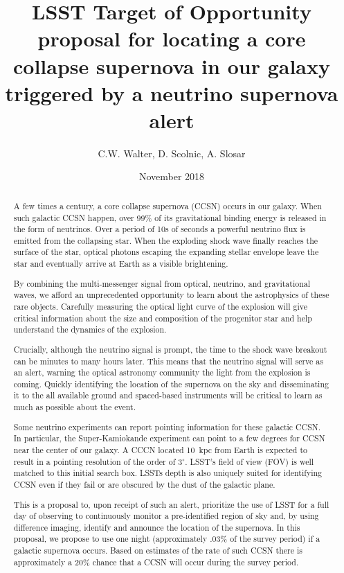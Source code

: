 \documentclass[12pt, letterpaper]{article}
\title{LSST Target of Opportunity proposal for locating a core collapse
  supernova in our galaxy triggered by a neutrino supernova alert}
\author{ C.W. Walter, D. Scolnic, A. Slosar}
\date{ November 2018}
\begin{document}
\maketitle

\begin{abstract}

  A few times a century, a core collapse supernova (CCSN) occurs in
  our galaxy. When such galactic CCSN happen, over 99\% of its
  gravitational binding energy is released in the form of neutrinos.
  Over a period of 10s of seconds a powerful neutrino flux is emitted
  from the collapsing star.  When the exploding shock wave finally
  reaches the surface of the star, optical photons escaping the
  expanding stellar envelope leave the star and eventually arrive at
  Earth as a visible brightening.

  By combining the multi-messenger signal from optical, neutrino, and
  gravitational waves, we afford an unprecedented opportunity to learn
  about the astrophysics of these rare objects. Carefully measuring
  the optical light curve of the explosion will give critical
  information about the size and composition of the progenitor star
  and help understand the dynamics of the explosion.

  Crucially, although the neutrino signal is prompt, the time to the
  shock wave breakout can be minutes to many hours later.  This means
  that the neutrino signal will serve as an alert, warning the
  optical astronomy community the light from the explosion is coming.  
  Quickly identifying the location of the supernova on the sky and
  disseminating it to the all available ground and spaced-based
  instruments will be critical to learn as much as possible about the
  event.

  Some neutrino experiments can report pointing information for these
  galactic CCSN. In particular, the Super-Kamiokande experiment can
  point to a few degrees for CCSN near the center of our galaxy.  A
  CCCN located 10~kpc from Earth is expected to result in a pointing
  resolution of the order of $3^\circ$.  LSST's field of view (FOV) is
  well matched to this initial search box.  LSSTs depth is also
  uniquely suited for identifying CCSN even if they fail or are
  obscured by the dust of the galactic plane.

  This is a proposal to, upon receipt of such an alert, prioritize the
  use of LSST for a full day of observing to continuously monitor a
  pre-identified region of sky and, by using difference imaging,
  identify and announce the location of the supernova. In this
  proposal, we propose to use one night (approximately .03\% of the
  survey period) if a galactic supernova occurs.  Based on estimates
  of the rate of such CCSN there is approximately a 20\% chance that a
  CCSN will occur during the survey period.
  
\end{abstract}
\end{document}
